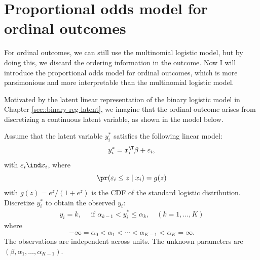 \section{Proportional odds model for ordinal outcomes}

For ordinal outcomes, we can still use the multinomial logistic model,
but by doing this, we discard the ordering information in the outcome.  Now I will introduce the proportional odds model for ordinal outcomes, which is more parsimonious and more interpretable than the multinomial logistic model.

Motivated by the latent linear representation of the binary logistic model in Chapter \ref{sec::binary-reg-latent},
we imagine that the ordinal outcome arises from discretizing a continuous
latent variable, as shown in the model below.


\begin{definition}
\label{def::model-polr}
Assume that the latent variable $y_i^*$ satisfies the following linear model:
\begin{eqnarray}
\label{eq::latent-ordinal}
y_{i}^{*}  =x_{i}^{\T}\beta+\varepsilon_{i},
\end{eqnarray}
with $\varepsilon_{i} \ind x_i$,  where 
$$
\pr(\varepsilon_{i}\leq z\mid x_{i})=g(z)
$$
with $g(z) = e^z / (1+e^z)$ is the CDF of the standard logistic distribution. 
Discretize $y_{i}^{*} $ to obtain the observed $y_i$: 
\begin{eqnarray}
\label{eq::discretization-ordinal}
y_{i} =k,\quad\text{ if }\alpha_{k-1} <  y_{i}^{*}\leq\alpha_{k},\quad(k=1,\ldots,K)
\end{eqnarray}
where 
\[
-\infty=\alpha_{0}<\alpha_{1}<\cdots<\alpha_{K-1}<\alpha_{K}=\infty.
\]
The observations are independent across units. 
The unknown parameters are $(\beta,\alpha_{1},\ldots,\alpha_{K-1})$.
\end{definition}


